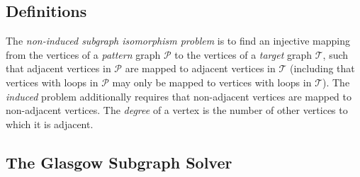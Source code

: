 \documentclass[runningheads]{llncs}
\newcommand{\neighbourhood}{\operatorname{N}}
\newcommand{\vertexset}{\operatorname{V}}
\newcommand{\citet}[2]{#1\cite{#2}}
\begin{document}
\subsection{Definitions}


The \emph{non-induced subgraph isomorphism problem} is to find an injective mapping from the
vertices of a \emph{pattern} graph $\mathcal{P}$ to the vertices of a \emph{target} graph
$\mathcal{T}$, such that adjacent vertices in $\mathcal{P}$ are mapped to adjacent vertices in
$\mathcal{T}$ (including that vertices with loops in $\mathcal{P}$ may only be mapped to vertices
with loops in $\mathcal{T}$).  The \emph{induced} problem additionally requires that non-adjacent
vertices are mapped to non-adjacent vertices. The \emph{degree} of a vertex is the number of other
vertices to which it is adjacent.


\subsection{The Glasgow Subgraph Solver}
\end{document}
